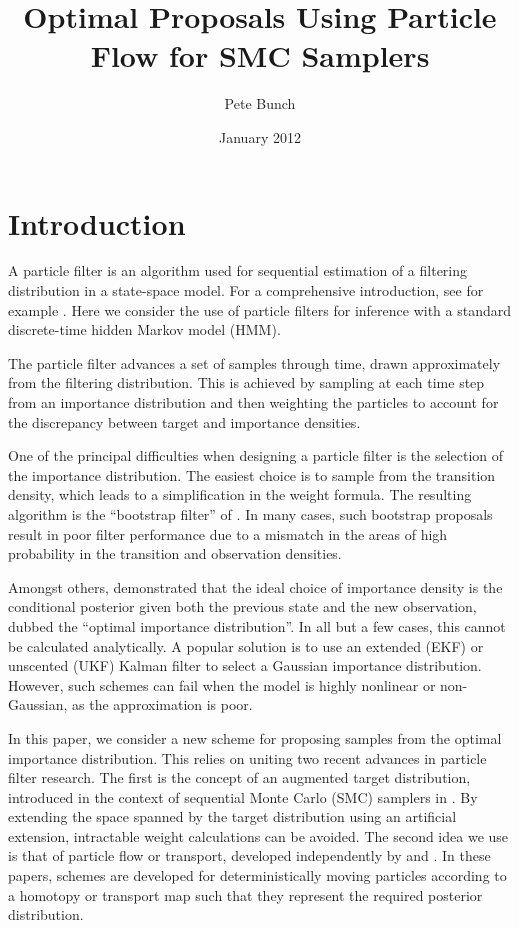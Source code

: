 \documentclass{article}
\title{Optimal Proposals Using Particle Flow for SMC Samplers}
\author{Pete Bunch}
\date{January 2012}
\begin{document}
\maketitle

\section{Introduction}

A particle filter is an algorithm used for sequential estimation of a filtering distribution in a state-space model. For a comprehensive introduction, see for example \cite{Cappe2007,Doucet2009}. Here we consider the use of particle filters for inference with a standard discrete-time hidden Markov model (HMM).

The particle filter advances a set of samples through time, drawn approximately from the filtering distribution. This is achieved by sampling at each time step from an importance distribution and then weighting the particles to account for the discrepancy between target and importance densities.

One of the principal difficulties when designing a particle filter is the selection of the importance distribution. The easiest choice is to sample from the transition density, which leads to a simplification in the weight formula. The resulting algorithm is the ``bootstrap filter'' of \cite{Gordon1993}. In many cases, such bootstrap proposals result in poor filter performance due to a mismatch in the areas of high probability in the transition and observation densities.

Amongst others, \cite{Doucet2000a} demonstrated that the ideal choice of importance density is the conditional posterior given both the previous state and the new observation, dubbed the ``optimal importance distribution''. In all but a few cases, this cannot be calculated analytically. A popular solution is to use an extended (EKF) or unscented (UKF) Kalman filter to select a Gaussian importance distribution. However, such schemes can fail when the model is highly nonlinear or non-Gaussian, as the approximation is poor.

In this paper, we consider a new scheme for proposing samples from the optimal importance distribution. This relies on uniting two recent advances in particle filter research. The first is the concept of an augmented target distribution, introduced in the context of sequential Monte Carlo (SMC) samplers in \cite{DelMoral2006}. By extending the space spanned by the target distribution using an artificial extension, intractable weight calculations can be avoided. The second idea we use is that of particle flow or transport, developed independently by \cite{Daum2008,Daum2011d} and \cite{Reich2011}. In these papers, schemes are developed for deterministically moving particles according to a homotopy or transport map such that they represent the required posterior distribution.
\end{document}
